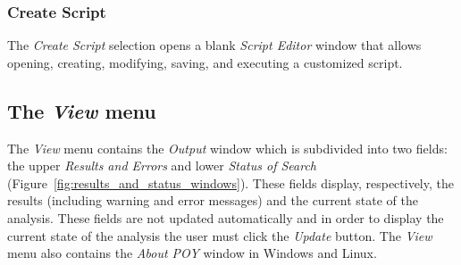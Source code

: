 {\subsubsection*{Create Script}
The \emph{Create Script} selection opens a blank \emph{Script Editor} window that allows opening, creating, modifying, saving, and executing  a customized script.

\subsection{The \emph{View} menu}

The \emph{View} menu contains the \emph{Output} window which is subdivided into two fields: the upper \emph{Results and Errors} and lower \emph{Status of Search} (Figure~\ref{fig:results_and_status_windows}). These fields display, respectively, the results (including warning and error messages) and the current state of the analysis. These fields are not updated automatically and in order to display the current state of the analysis the user must click the \emph{Update} button. The \emph{View} menu also contains the \emph{About POY} window in Windows and Linux.

}
